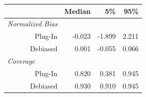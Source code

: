 
\begin{tabular}{r|rrr}
\toprule
  & Median & 5\% & 95\%\\
\midrule
\multicolumn{1}{l|}{\textit{Normalized Bias}}\\
Plug-In & -0.023 & -1.899 & 2.211\\
Debiased & 0.001 & -0.055 & 0.066\\
\midrule
\multicolumn{1}{l|}{\textit{Coverage}}\\
Plug-In & 0.820 & 0.381 & 0.945\\
Debiased & 0.930 & 0.910 & 0.945\\
\bottomrule
\end{tabular}
